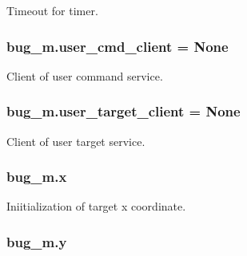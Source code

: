 Timeout for timer. 

\subsubsection[{\texorpdfstring{user\+\_\+cmd\+\_\+client}{user_cmd_client}}]{\setlength{\rightskip}{0pt plus 5cm}bug\+\_\+m.\+user\+\_\+cmd\+\_\+client = None}\hypertarget{namespacebug__m_a714bf24ade1dcbaabdd0e6e1779871bd}{}\label{namespacebug__m_a714bf24ade1dcbaabdd0e6e1779871bd}


Client of user command service. 

\subsubsection[{\texorpdfstring{user\+\_\+target\+\_\+client}{user_target_client}}]{\setlength{\rightskip}{0pt plus 5cm}bug\+\_\+m.\+user\+\_\+target\+\_\+client = None}\hypertarget{namespacebug__m_ac15f809b3beeffde1c35d3483fe0f07d}{}\label{namespacebug__m_ac15f809b3beeffde1c35d3483fe0f07d}


Client of user target service. 

\subsubsection[{\texorpdfstring{x}{x}}]{\setlength{\rightskip}{0pt plus 5cm}bug\+\_\+m.\+x}\hypertarget{namespacebug__m_af10f89c7f929c9babce108f5d7382996}{}\label{namespacebug__m_af10f89c7f929c9babce108f5d7382996}


Iniitialization of target x coordinate. 

\subsubsection[{\texorpdfstring{y}{y}}]{\setlength{\rightskip}{0pt plus 5cm}bug\+\_\+m.\+y}\hypertarget{namespacebug__m_ab8596d2ae799585b0d89152b55891aa8}{}\label{namespacebug__m_ab8596d2ae799585b0d89152b55891aa8}


